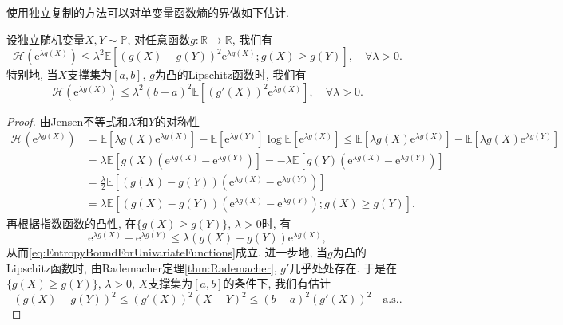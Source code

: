 使用独立复制的方法可以对单变量函数熵的界做如下估计. 
\begin{lemma}[单变量函数熵的界]\label{lemma:EntropyBoundForUnivariateFunctions}
	设独立随机变量$X, Y \sim \mathbb{P}$, 对任意函数$g \colon \mathbb{R} \to \mathbb{R}$, 我们有
	\begin{equation}\label{eq:EntropyBoundForUnivariateFunctions}
		\mathcal{H}(\mathrm{e}^{\lambda g(X)})
		\leq \lambda^2 \mathbb{E}[ (g(X) - g(Y))^2 \mathrm{e}^{\lambda g(X)}; g(X) \geq g(Y) ], \quad \forall \lambda > 0.
	\end{equation}
	特别地, 当$X$支撑集为$[a, b]$, $g$为凸的Lipschitz函数时, 我们有
	\begin{equation*}
		\mathcal{H}(\mathrm{e}^{\lambda g(X)}) 
		\leq \lambda^2 (b-a)^2 \mathbb{E}[(g'(X))^2 \mathrm{e}^{\lambda g(X)}], \quad \forall \lambda > 0.
	\end{equation*}
\end{lemma}
\begin{proof}
	由Jensen不等式和$X$和$Y$的对称性
	\begin{align*}
		\mathcal{H}(\mathrm{e}^{\lambda g(X)})
		&= \mathbb{E}[\lambda g(X) \mathrm{e}^{\lambda g(X)}] - \mathbb{E}[\mathrm{e}^{\lambda g(Y)}] \log \mathbb{E}[\mathrm{e}^{\lambda g(X)}] 
		\leq \mathbb{E}[\lambda g(X) \mathrm{e}^{\lambda g(X)}] - \mathbb{E}[\lambda g(X) \mathrm{e}^{\lambda g(Y)}] \\
		&= \lambda \mathbb{E}[ g(X) (\mathrm{e}^{\lambda g(X)}-  \mathrm{e}^{\lambda g(Y)})] 
		= - \lambda \mathbb{E}[ g(Y) (\mathrm{e}^{\lambda g(X)}-  \mathrm{e}^{\lambda g(Y)})] \\
		&= \frac{\lambda}{2} \mathbb{E}\left[(g(X) - g(Y)) (\mathrm{e}^{\lambda g(X)} - \mathrm{e}^{\lambda g(Y)})\right] \\
		&= \lambda \mathbb{E}\left[(g(X) - g(Y)) (\mathrm{e}^{\lambda g(X)} - \mathrm{e}^{\lambda g(Y)}); g(X) \geq g(Y) \right].
	\end{align*}
	再根据指数函数的凸性, 在$\{g(X) \geq g(Y)\}$, $\lambda > 0$时, 有
	\begin{equation*}
		\mathrm{e}^{\lambda g(X)} - \mathrm{e}^{\lambda g(Y)} \leq \lambda(g(X) - g(Y)) \mathrm{e}^{\lambda g(X)}, 
	\end{equation*}
	从而\eqref{eq:EntropyBoundForUnivariateFunctions}成立. 
	进一步地, 当$g$为凸的Lipschitz函数时, 由Rademacher定理\ref{thm:Rademacher}, $g'$几乎处处存在. 
	于是在$\{g(X) \geq g(Y)\}$, $\lambda > 0$, $X$支撑集为$[a, b]$的条件下, 我们有估计
	\begin{equation*}
		(g(X) - g(Y))^2 \leq (g'(X))^2 (X-Y)^2 \leq (b-a)^2 (g'(X))^2 \quad \text{a.s.}.
	\end{equation*}
\end{proof}

